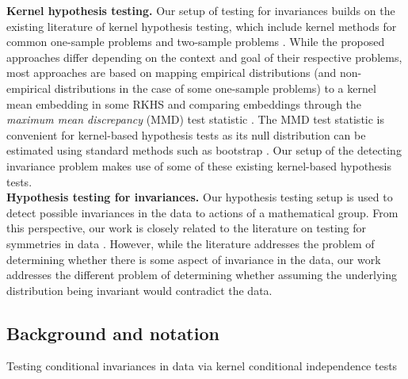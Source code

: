 \textbf{Kernel hypothesis testing.} Our setup of testing for invariances builds on the existing literature of kernel hypothesis testing, which include kernel methods for common one-sample problems \parencite{Zhang:2011,Doran:2014,Kellner:2015,Chwialkowski:2016,Jitkrittum:2020} and two-sample problems \parencite{Gretton:2007,Gretton:2012}. While the proposed approaches differ depending on the context and goal of their respective problems, most approaches are based on mapping empirical  distributions (and non-empirical distributions in the case of some one-sample problems) to a kernel mean embedding in some RKHS and comparing embeddings through the \textit{maximum mean discrepancy} (MMD) test statistic \parencite{Harchaoui:2013}. The MMD test statistic is convenient for kernel-based hypothesis tests as its null distribution can be estimated using standard methods such as bootstrap \parencite{Gretton:2012}. Our setup of the detecting invariance problem makes use of some of these existing kernel-based hypothesis tests.
\\

\textbf{Hypothesis testing for invariances.}
Our hypothesis testing setup is used to detect possible invariances in the data to actions of a mathematical group. From this perspective, our work is closely related to the literature on testing for symmetries in data \parencite{Henze:2003,NgatchouWandji:2009,Partlett:2015}. However, while the literature addresses the problem of determining whether there is some aspect of invariance in the data, our work addresses the different problem of determining whether assuming the underlying distribution being invariant would contradict the data.

\subsection{Background and notation}

Testing conditional invariances in data via kernel conditional independence tests


